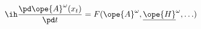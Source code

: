 \begin{equation}	\label{12.98}
\ih \frac{\pd\ope{A}^{\omega}(x_t)}{\pd t}
=
F( \ope{A}^{\omega}, \underline{\ope{H}}^{\omega},\ldots )
	\end{equation}

